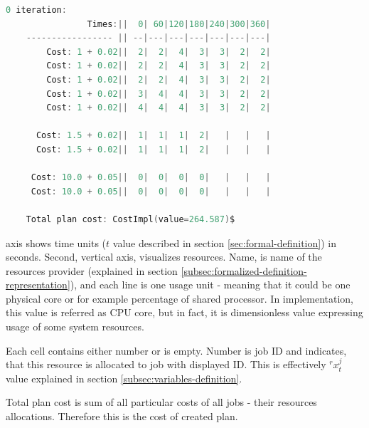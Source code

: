 \begin{lstlisting}[caption={Simulation data output},label={lst:data-example},language=Kotlin]
    0 iteration:
                Times:||  0| 60|120|180|240|300|360|
    ----------------- || --|---|---|---|---|---|---|
        Cost: 1 + 0.02||  2|  2|  4|  3|  3|  2|  2|
        Cost: 1 + 0.02||  2|  2|  4|  3|  3|  2|  2|
        Cost: 1 + 0.02||  2|  2|  4|  3|  3|  2|  2|
        Cost: 1 + 0.02||  3|  4|  4|  3|  3|  2|  2|
        Cost: 1 + 0.02||  4|  4|  4|  3|  3|  2|  2|

      Cost: 1.5 + 0.02||  1|  1|  1|  2|   |   |   |
      Cost: 1.5 + 0.02||  1|  1|  1|  2|   |   |   |

     Cost: 10.0 + 0.05||  0|  0|  0|  0|   |   |   |
     Cost: 10.0 + 0.05||  0|  0|  0|  0|   |   |   |

    Total plan cost: CostImpl(value=264.587)$
\end{lstlisting}

\bigskip \noindent
{} axis shows time units ($t$ value described in section \ref{sec:formal-definition}) in seconds.
Second, vertical axis, visualizes resources.
Name,  is name of the resources provider (explained in section \ref{subsec:formalized-definition-representation}),
and each line is one usage unit - meaning that it could be one physical core or for example percentage of shared processor.
In implementation, this value is referred as CPU core,
but in fact, it is dimensionless value expressing usage of some system resources.

Each cell contains either number or is empty.
Number is job ID and indicates, that this resource is allocated to job with displayed ID.
This is effectively $^{r}x_{t}^{j}$ value explained in section \ref{subsec:variables-definition}.

Total plan cost is sum of all particular costs of all jobs - their resources allocations.
Therefore this is the cost of created plan.